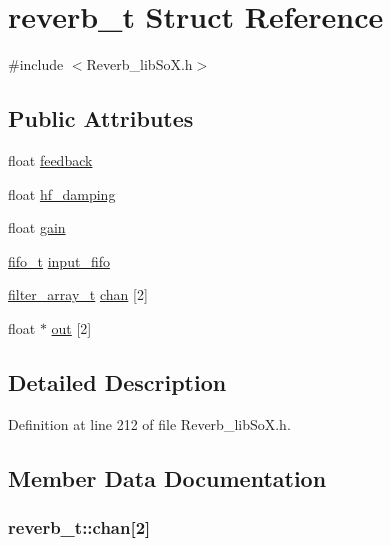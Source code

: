 \hypertarget{structreverb__t}{}\section{reverb\+\_\+t Struct Reference}
\label{structreverb__t}


{\ttfamily \#include $<$Reverb\+\_\+lib\+So\+X.\+h$>$}

\subsection*{Public Attributes}
\begin{DoxyCompactItemize}
\item 
float \hyperlink{structreverb__t_a8e09720386c31e99f2f011b3cee5c6c0}{feedback}
\item 
float \hyperlink{structreverb__t_a90fe27c0300bfecd2bc770d908c0797d}{hf\+\_\+damping}
\item 
float \hyperlink{structreverb__t_ab361b62127cc123d7c218d0b2667d9e9}{gain}
\item 
\hyperlink{structfifo__t}{fifo\+\_\+t} \hyperlink{structreverb__t_a600770163691a92853976fe0f5e70cce}{input\+\_\+fifo}
\item 
\hyperlink{structfilter__array__t}{filter\+\_\+array\+\_\+t} \hyperlink{structreverb__t_ad9f855c12439a12bb26c1cc458bdd558}{chan} \mbox{[}2\mbox{]}
\item 
float $\ast$ \hyperlink{structreverb__t_a78f52a87921cb45de0dc772e0fa6fd32}{out} \mbox{[}2\mbox{]}
\end{DoxyCompactItemize}


\subsection{Detailed Description}


Definition at line 212 of file Reverb\+\_\+lib\+So\+X.\+h.



\subsection{Member Data Documentation}
\subsubsection[{\texorpdfstring{chan}{chan}}]{ reverb\+\_\+t\+::chan\mbox{[}2\mbox{]}}\hypertarget{structreverb__t_ad9f855c12439a12bb26c1cc458bdd558}{}\label{structreverb__t_ad9f855c12439a12bb26c1cc458bdd558}


